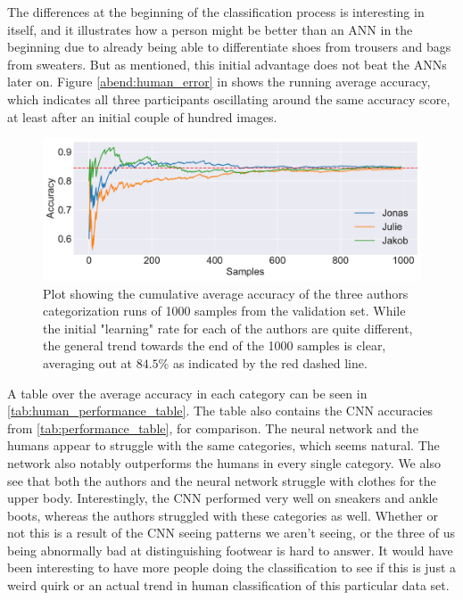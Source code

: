 \documentclass[10pt, twocolumn]{article}
\begin{document}
The differences at the beginning of the classification process is interesting in itself, and it illustrates how a person might be better than an ANN in the beginning due to already being able to differentiate shoes from trousers and bags from sweaters. But as mentioned, this initial advantage does not beat the ANNs later on. Figure \cref{abend:human_error} in \label{abend:human_error} shows the running average accuracy, which indicates all three participants oscillating around the same accuracy score, at least after an initial couple of hundred images.

\begin{figure}[H]
    \centering
    \includegraphics[scale=0.4]{figs/human_cumulative.pdf}
    \caption{Plot showing the cumulative average accuracy of the three authors categorization runs of 1000 samples from the validation set. While the initial "learning" rate for each of the authors are quite different, the general trend towards the end of the 1000 samples is clear, averaging out at $84.5\%$ as indicated by the red dashed line.}
    \label{fig:human_cumulative}
\end{figure}

A table over the average accuracy in each category can be seen in \cref{tab:human_performance_table}. The table also contains the CNN accuracies from \cref{tab:performance_table}, for comparison. The neural network and the humans appear to struggle with the same categories, which seems natural. The network also notably outperforms the humans in every single category. We also see that both the authors and the neural network struggle with clothes for the upper body. Interestingly, the CNN performed very well on sneakers and ankle boots, whereas the authors struggled with these categories as well. Whether or not this is a result of the CNN seeing patterns we aren't seeing, or the three of us being abnormally bad at distinguishing footwear is hard to answer. It would have been interesting to have more people doing the classification to see if this is just a weird quirk or an actual trend in human classification of this particular data set.
\end{document}
